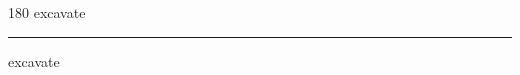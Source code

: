 
\begin{frame}
\begin{center}
\begin{turn}{180}
{\fontsize{2.5cm}{1em}\selectfont excavate}
\end{turn}
\vspace{1em}\par  
\hrule
\vspace{1em}\par  
{\fontsize{2.5cm}{1em}\selectfont excavate}
\end{center}
\end{frame}
